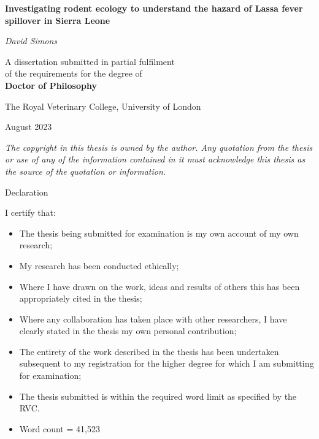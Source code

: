 \begin{titlepage}

\begin{centering}

\huge

\doublespacing

\vspace*{2cm}

{\bf Investigating rodent ecology to understand the hazard of Lassa fever spillover in Sierra Leone}

\vspace{1cm}

\large

{\em David Simons}

\vspace{2cm}

A dissertation submitted in partial fulfilment \\of the requirements for the degree of \\{\bf Doctor of Philosophy}

\vspace{1.5cm}

The Royal Veterinary College, University of London

\normalsize
August 2023

\vspace{1.5cm}

{\em The copyright in this thesis is owned by the author. Any quotation from the thesis or use of any of the information contained in it must acknowledge this thesis as the source of the quotation or information.}

\end{centering}

\end{titlepage}

\newpage

\Large

Declaration

\normalsize

I certify that:  

\begin{itemize}
  \item The thesis being submitted for examination is my own account of my own research;  
  \item My research has been conducted ethically;  
  \item Where I have drawn on the work, ideas and results of others this has been appropriately cited in the thesis;  
  \item Where any collaboration has taken place with other researchers, I have clearly stated in the thesis my own personal contribution;  
  \item The entirety of the work described in the thesis has been undertaken subsequent to my registration for the higher degree for which I am submitting for examination;  
  \item The thesis submitted is within the required word limit as specified by the RVC.  
  \item Word count = 41,523
\end{itemize}

